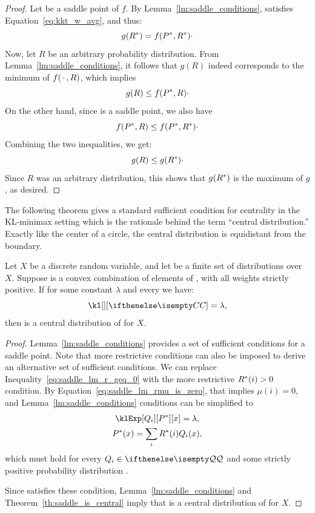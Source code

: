 \begin{proof}
    Let \saddle be a saddle point of $f$.
    By Lemma~\ref{lm:saddle_conditions}, \saddP satisfies Equation~\ref{eq:kkt_w_avg}, and thus:
    \[
        g(R^{*}) = f(P^{*}, R^{*}) \cdot
    \]
    Now, let $R$ be an arbitrary probability distribution.
    From Lemma~\ref{lm:saddle_conditions}, it follows that $g(R)$ indeed corresponds to the minimum of $f(\, \cdot \,, R)$,
    which implies
    \[
        g(R) \leq f(P^{*},R) \cdot
    \]
    On the other hand, since \saddle is a saddle point, we also have
    \[
        f(P^{*}, R) \leq f(P^{*}, R^{*}) \cdot
    \]
    Combining the two inequalities, we get:
    \[
        g(R) \leq g(R^{*}) \cdot
    \]
    Since $R$ was an arbitrary distribution, this shows that $g(R^{*})$ is the maximum of $g$, as desired.
\end{proof}

The following theorem gives a standard sufficient condition for centrality in the KL-minimax setting which is
the rationale behind the term ``central distribution.''
Exactly like the center of a circle, the central distribution is equidistant from the boundary.

\begin{theorem} [Centrality]
    \label{th:lambda-centrality}
    Let $X$ be a discrete random variable, and let \setQ be a finite set of distributions over $X$.
    Suppose \cDist is a convex combination of elements of \setQ, with all weights strictly positive.
    If for some constant $\lambda$ and every  we have:
    \begin{equation*}
        \kl[][\cDist] = \lambda,
    \end{equation*}
    then \cDist is a central distribution of \setQ for $X$.
\end{theorem}

\begin{proof}
    Lemma~\ref{lm:saddle_conditions} provides a set of sufficient conditions for a saddle point.
    Note that more restrictive conditions can also be imposed to derive an alternative set of sufficient conditions.
    We can replace Inequality~\ref{eq:saddle_lm_r_geq_0} with the more
    restrictive $R^{*}(i) > 0$ condition.
    By Equation~\ref{eq:saddle_lm_rmu_is_zero}, that implies $\mu(i) = 0$,
    and Lemma~\ref{lm:saddle_conditions} conditions can be simplified to
    \begin{gather*}
        \klExp[Q_i][\saddP][x] = \lambda, \\
        \saddP(x) = \sum_i \saddR(i) Q_i(x),
    \end{gather*}
    which must hold for every $Q_i \in \setQ$ and some strictly positive probability distribution \saddR.

    Since \cDist satisfies these condition, Lemma~\ref{lm:saddle_conditions} and
    Theorem~\ref{th:saddle_is_central} imply that \cDist is a central distribution of \setQ for $X$.
\end{proof}


